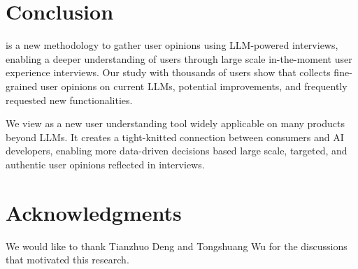 \section{Conclusion}

\method{} is a new methodology to gather user opinions  using LLM-powered interviews, enabling a deeper understanding of users through large scale in-the-moment user experience interviews.
Our study with thousands of users show that \method{} collects fine-grained user opinions on current LLMs, potential improvements, and frequently requested new functionalities. 

We view \method{} as a new user understanding tool widely applicable on many products beyond LLMs.
It creates a tight-knitted connection between consumers and AI developers, enabling more data-driven decisions based large scale, targeted, and authentic user opinions reflected in interviews.

\section{Acknowledgments}
We would like to thank Tianzhuo Deng and Tongshuang Wu for the discussions that motivated this research.